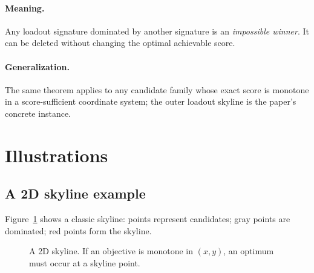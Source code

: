 \documentclass[11pt]{article}
\theoremstyle{plain}
\begin{document}
\paragraph{Meaning.} Any loadout signature dominated by another signature is an \emph{impossible winner}. It can be deleted without changing the optimal achievable score.

\paragraph{Generalization.} The same theorem applies to any candidate family whose exact score is monotone in a score-sufficient coordinate system; the outer loadout skyline is the paper's concrete instance.

\section{Illustrations}

\subsection{A 2D skyline example}
Figure~\ref{fig:2d-skyline} shows a classic skyline: points represent candidates; gray points are dominated; red points form the skyline.

\begin{figure}[ht]
\centering
{}
\caption{A 2D skyline. If an objective is monotone in $(x,y)$, an optimum must occur at a skyline point.}
\label{fig:2d-skyline}
\end{figure}
\end{document}
